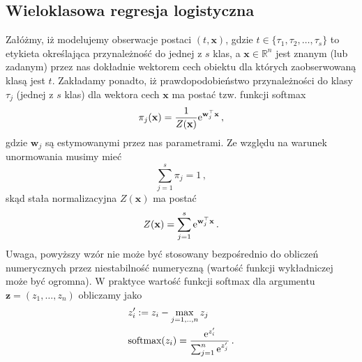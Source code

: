 \documentclass{myclass}
\begin{document}
\subsection{Wieloklasowa regresja logistyczna}

Załóżmy, iż modelujemy obserwacje postaci \((t,\mathbf{x})\), gdzie \(t \in
\{\tau_1,\tau_2,\ldots,\tau_s\}\) to etykieta określająca przynależność do jednej z \(s\) klas, a
\(\mathbf{x} \in \mathbb{R}^n\) jest znanym (lub zadanym) przez nas dokładnie wektorem cech obiektu
dla których zaobserwowaną klasą jest \(t\). Zakładamy ponadto, iż prawdopodobieństwo przynależności
do klasy \(\tau_j\) (jednej z \(s\) klas) dla wektora cech \(\mathbf{x}\) ma postać tzw. funkcji
softmax
\begin{equation*}
    \pi_j(\mathbf{x}) = \frac{1}{Z(\mathbf{x})}\mathrm{e}^{\mathbf{w}_j^\top\mathbf{x}}\,,
\end{equation*}
gdzie \(\mathbf{w}_j\) są estymowanymi przez nas parametrami. Ze względu na warunek unormowania
musimy mieć
\begin{equation*}
    \sum_{j=1}^s \pi_j = 1\,,
\end{equation*}
skąd stała normalizacyjna \(Z(\mathbf{x})\) ma postać
\begin{equation*}
    Z(\mathbf{x}) = \sum_{j=1}^s \mathrm{e}^{\mathbf{w}_j^\top\mathbf{x}}\,.
\end{equation*}
Uwaga, powyższy wzór nie może być stosowany bezpośrednio do obliczeń numerycznych przez
niestabilność numeryczną (wartość funkcji wykładniczej może być ogromna). W praktyce wartość funkcji
softmax dla argumentu \(\mathbf{z} = (z_1,\ldots,z_n)\) obliczamy jako
\begin{equation*}
    \begin{split}
        &z'_i := z_i - \max_{j=1,..,n} z_j\\
        &\text{softmax}(z_i) = \frac{\mathrm{e}^{z_i'}}{\sum_{j=1}^n \mathrm{e}^{z_j'}}\,.
    \end{split}
\end{equation*}
\end{document}
